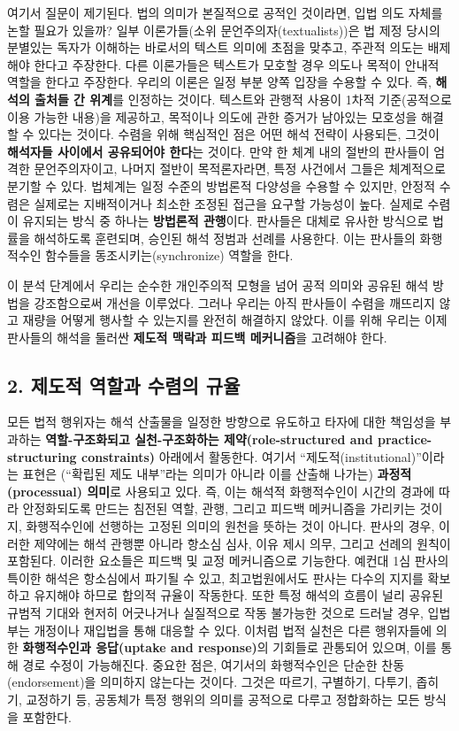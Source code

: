 \documentclass[12pt,a4paper]{article}
\begin{document}
여기서 질문이 제기된다. 법의 의미가 본질적으로 공적인 것이라면, 입법
의도 자체를 논할 필요가 있을까? 일부 이론가들(소위
문언주의자(textualists))은 법 제정 당시의 \textsf{분별있는 독자가 이해하는
바}로서의 텍스트 의미에 초점을 맞추고, 주관적 의도는 배제해야 한다고
주장한다. 다른 이론가들은 텍스트가 모호할 경우 의도나 목적이 안내적
역할을 한다고 주장한다. 우리의 이론은 일정 부분 양쪽 입장을 수용할 수
있다. 즉, \textbf{해석의 출처들 간 위계}를 인정하는 것이다. 텍스트와
관행적 사용이 1차적 기준(공적으로 이용 가능한 내용)을 제공하고, 목적이나
의도에 관한 증거가 남아있는 모호성을 해결할 수 있다는 것이다. 수렴을
위해 핵심적인 점은 어떤 해석 전략이 사용되든, 그것이 \textbf{해석자들
사이에서 공유되어야 한다}는 것이다. 만약 한 체계 내의 절반의 판사들이
엄격한 문언주의자이고, 나머지 절반이 목적론자라면, 특정 사건에서 그들은
체계적으로 분기할 수 있다. 법체계는 일정 수준의 방법론적 다양성을 수용할
수 있지만, 안정적 수렴은 실제로는 지배적이거나 최소한 조정된 접근을
요구할 가능성이 높다. 실제로 수렴이 유지되는 방식 중 하나는
\textbf{방법론적 관행}이다. 판사들은 대체로 유사한 방식으로 법률을
해석하도록 훈련되며, 승인된 해석 정범과 선례를 사용한다. 이는 판사들의
화행적수인 함수들을 동조시키는(synchronize) 역할을 한다.

이 분석 단계에서 우리는 순수한 개인주의적 모형을 넘어 공적 의미와 공유된
해석 방법을 강조함으로써 개선을 이루었다. 그러나 우리는 아직 판사들이
수렴을 깨뜨리지 않고 재량을 어떻게 행사할 수 있는지를 완전히 해결하지
않았다. 이를 위해 우리는 이제 판사들의 해석을 둘러싼 \textbf{제도적
맥락과 피드백 메커니즘}을 고려해야 한다.

\subsection{2. 제도적 역할과 수렴의
규율}

모든 법적 행위자는 해석 산출물을 일정한 방향으로 유도하고 타자에 대한
책임성을 부과하는 \textbf{역할-구조화되고 실천-구조화하는
제약(role-structured and practice-structuring constraints)} 아래에서
활동한다. 여기서 ``제도적(institutional)''이라는 표현은 (``확립된 제도
내부''라는 의미가 아니라 이를 산출해 나가는) \textbf{과정적(processual)
의미}로 사용되고 있다. 즉, 이는 해석적 화행적수인이 시간의 경과에 따라
안정화되도록 만드는 침전된 역할, 관행, 그리고 피드백 메커니즘을 가리키는
것이지, 화행적수인에 선행하는 고정된 의미의 원천을 뜻하는 것이 아니다.
판사의 경우, 이러한 제약에는 해석 관행뿐 아니라 항소심 심사, 이유 제시
의무, 그리고 선례의 원칙이 포함된다. 이러한 요소들은 피드백 및 교정
메커니즘으로 기능한다. 예컨대 1심 판사의 특이한 해석은 항소심에서 파기될
수 있고, 최고법원에서도 판사는 다수의 지지를 확보하고 유지해야 하므로
합의적 규율이 작동한다. 또한 특정 해석의 흐름이 널리 공유된 규범적
기대와 현저히 어긋나거나 실질적으로 작동 불가능한 것으로 드러날 경우,
입법부는 개정이나 재입법을 통해 대응할 수 있다. 이처럼 법적 실천은 다른
행위자들에 의한 \textbf{화행적수인과 응답(uptake and response)}의
기회들로 관통되어 있으며, 이를 통해 경로 수정이 가능해진다. 중요한 점은,
여기서의 화행적수인은 단순한 찬동(endorsement)을 의미하지 않는다는
것이다. 그것은 따르기, 구별하기, 다투기, 좁히기, 교정하기 등, 공동체가
특정 행위의 의미를 공적으로 다루고 정합화하는 모든 방식을 포함한다.
\end{document}
